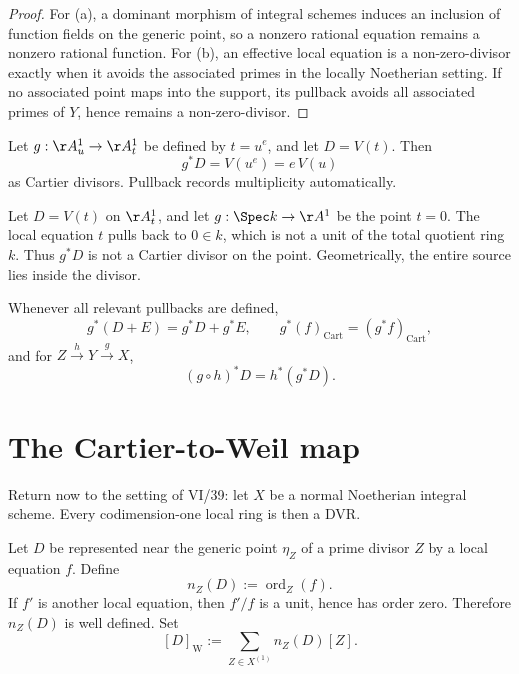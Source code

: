 \begin{proof}
For (a), a dominant morphism of integral schemes induces an inclusion of function fields on the generic point, so a nonzero rational equation remains a nonzero rational function.  For (b), an effective local equation is a non-zero-divisor exactly when it avoids the associated primes in the locally Noetherian setting.  If no associated point maps into the support, its pullback avoids all associated primes of \(Y\), hence remains a non-zero-divisor.
\end{proof}



\begin{example}\label{ex:vi40-ramification}
Let \(g:\AA^1_u\to\AA^1_t\) be defined by \(t=u^e\), and let \(D=V(t)\).  Then
\[
 g^*D=V(u^e)=e\,V(u)
\]
as Cartier divisors.  Pullback records multiplicity automatically.
\end{example}

\begin{example}\label{ex:vi40-pullback-fails}
Let \(D=V(t)\) on \(\AA^1_t\), and let \(g:\Spec k\to\AA^1\) be the point \(t=0\).  The local equation \(t\) pulls back to \(0\in k\), which is not a unit of the total quotient ring \(k\).  Thus \(g^*D\) is not a Cartier divisor on the point.  Geometrically, the entire source lies inside the divisor.
\end{example}

\begin{proposition}\label{prop:vi40-pullback-functorial}
Whenever all relevant pullbacks are defined,
\[
 g^*(D+E)=g^*D+g^*E,
 \qquad
 g^*(f)_{\mathrm{Cart}}=(g^*f)_{\mathrm{Cart}},
\]
and for \(Z\xrightarrow{h}Y\xrightarrow{g}X\),
\[
 (g\circ h)^*D=h^*(g^*D).
\]
\end{proposition}

\section{The Cartier-to-Weil map}
Return now to the setting of VI/39: let \(X\) be a normal Noetherian integral scheme.  Every codimension-one local ring is then a DVR.

\begin{construction}\label{con:vi40-cartier-weil}
Let \(D\) be represented near the generic point \(\eta_Z\) of a prime divisor \(Z\) by a local equation \(f\).  Define
\[
 n_Z(D):=\operatorname{ord}_Z(f).
\]
If \(f'\) is another local equation, then \(f'/f\) is a unit, hence has order zero.  Therefore \(n_Z(D)\) is well defined.  Set
\[
 [D]_{\mathrm W}:=\sum_{Z\in X^{(1)}}n_Z(D)[Z].
\]
\end{construction}

